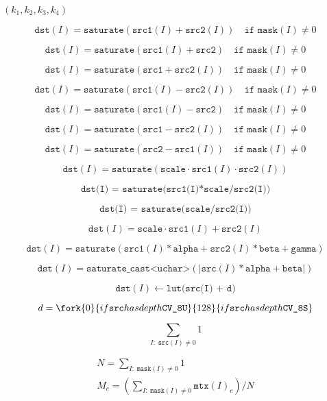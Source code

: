 \documentclass{article}
\begin{document}
$(k_1, k_2, k_3, k_4)$
\pagebreak

\[\texttt{dst}(I) =  \texttt{saturate} ( \texttt{src1}(I) +  \texttt{src2}(I)) \quad \texttt{if mask}(I) \ne0\]
\pagebreak

\[\texttt{dst}(I) =  \texttt{saturate} ( \texttt{src1}(I) +  \texttt{src2} ) \quad \texttt{if mask}(I) \ne0\]
\pagebreak

\[\texttt{dst}(I) =  \texttt{saturate} ( \texttt{src1} +  \texttt{src2}(I) ) \quad \texttt{if mask}(I) \ne0\]
\pagebreak

\[\texttt{dst}(I) =  \texttt{saturate} ( \texttt{src1}(I) -  \texttt{src2}(I)) \quad \texttt{if mask}(I) \ne0\]
\pagebreak

\[\texttt{dst}(I) =  \texttt{saturate} ( \texttt{src1}(I) -  \texttt{src2} ) \quad \texttt{if mask}(I) \ne0\]
\pagebreak

\[\texttt{dst}(I) =  \texttt{saturate} ( \texttt{src1} -  \texttt{src2}(I) ) \quad \texttt{if mask}(I) \ne0\]
\pagebreak

\[\texttt{dst}(I) =  \texttt{saturate} ( \texttt{src2} -  \texttt{src1}(I) ) \quad \texttt{if mask}(I) \ne0\]
\pagebreak

\[\texttt{dst} (I)= \texttt{saturate} ( \texttt{scale} \cdot \texttt{src1} (I)  \cdot \texttt{src2} (I))\]
\pagebreak

\[\texttt{dst(I) = saturate(src1(I)*scale/src2(I))}\]
\pagebreak

\[\texttt{dst(I) = saturate(scale/src2(I))}\]
\pagebreak

\[\texttt{dst} (I)= \texttt{scale} \cdot \texttt{src1} (I) +  \texttt{src2} (I)\]
\pagebreak

\[\texttt{dst} (I)= \texttt{saturate} ( \texttt{src1} (I)* \texttt{alpha} +  \texttt{src2} (I)* \texttt{beta} +  \texttt{gamma} )\]
\pagebreak

\[\texttt{dst} (I)= \texttt{saturate\_cast<uchar>} (| \texttt{src} (I)* \texttt{alpha} +  \texttt{beta} |)\]
\pagebreak

\[\texttt{dst} (I)  \leftarrow \texttt{lut(src(I) + d)}\]
\pagebreak

\[d =  \fork{0}{if \texttt{src} has depth \texttt{CV\_8U}}{128}{if \texttt{src} has depth \texttt{CV\_8S}}\]
\pagebreak

\[\sum _{I: \; \texttt{src} (I) \ne0 } 1\]
\pagebreak

\[\begin{array}{l} N =  \sum _{I: \; \texttt{mask} (I) \ne 0} 1 \\ M_c =  \left ( \sum _{I: \; \texttt{mask} (I) \ne 0}{ \texttt{mtx} (I)_c} \right )/N \end{array}\]
\pagebreak
\end{document}
